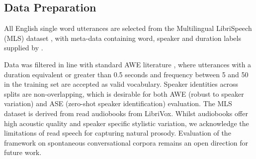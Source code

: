 \documentclass[conference,letterpaper]{IEEEtran}
\begin{document}
\subsection{Data Preparation}
\label{sec:data_prep}
All English single word utterances are selected from the Multilingual LibriSpeech (MLS) dataset \cite{Pratap2020MLSAL} , with meta-data containing word, speaker and duration labels supplied by \cite{meghanani-hain-2024-improving}.

\begin{table}[H]
    \centering
    \caption{A summary of statistics across each data split}
    \label{tab:data_stats}
\end{table}
\noindent Data was filtered in line with standard AWE literature \cite{DBLP:journals/corr/abs-1811-00403}, where utterances with a duration equivalent or greater than 0.5 seconds and frequency between 5 and 50 in the training set are accepted as valid vocabulary. Speaker identities across splits are non-overlapping, which is desirable for both AWE (robust to speaker variation) and ASE (zero-shot speaker identification) evaluation. The MLS dataset is  derived from read audiobooks from LibriVox. Whilst audiobooks offer high acoustic quality and speaker specific stylistic variation, we acknowledge the limitations of read speech for capturing natural prosody. Evaluation of the framework on spontaneous conversational corpora remains an open direction for future work. 

\end{document}
